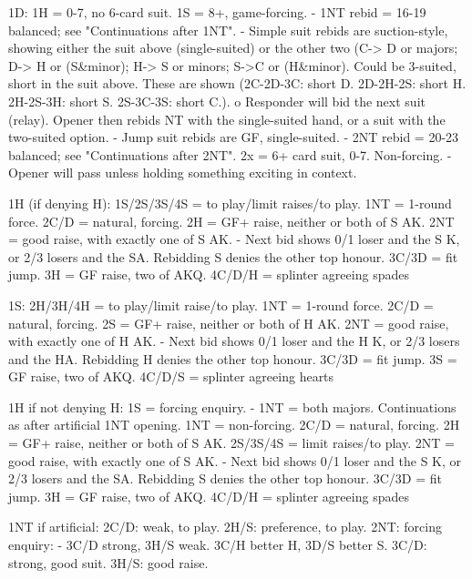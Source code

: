 1D:
   1H = 0-7, no 6-card suit.
   1S = 8+, game-forcing.
      - 1NT rebid = 16-19 balanced; see "Continuations after 1NT".
      - Simple suit rebids are suction-style, showing either the suit above
         (single-suited) or the other two (C-> D or majors; D-> H or (S&minor); H->
         S or minors; S->C or (H&minor). Could be 3-suited, short in the suit
         above. These are shown (2C-2D-3C: short D. 2D-2H-2S: short H. 2H-2S-3H:
         short S. 2S-3C-3S: short C.).
            o Responder will bid the next suit (relay). Opener then rebids NT with the
               single-suited hand, or a suit with the two-suited option.
      - Jump suit rebids are GF, single-suited.
      - 2NT rebid = 20-23 balanced; see "Continuations after 2NT".
   2x = 6+ card suit, 0-7. Non-forcing.
      - Opener will pass unless holding something exciting in context.

1H (if denying H):
   1S/2S/3S/4S = to play/limit raises/to play.
   1NT = 1-round force.
   2C/D = natural, forcing.
   2H = GF+ raise, neither or both of S AK.
   2NT = good raise, with exactly one of S AK.
      - Next bid shows 0/1 loser and the S K, or 2/3 losers and the SA.
         Rebidding S denies the other top honour.
   3C/3D = fit jump.
   3H = GF raise, two of AKQ.
   4C/D/H = splinter agreeing spades

1S:
   2H/3H/4H = to play/limit raise/to play.
   1NT = 1-round force.
   2C/D = natural, forcing.
   2S = GF+ raise, neither or both of H AK.
   2NT = good raise, with exactly one of H AK.
      - Next bid shows 0/1 loser and the H K, or 2/3 losers and the HA.
         Rebidding H denies the other top honour.
   3C/3D = fit jump.
   3S = GF raise, two of AKQ.
   4C/D/S = splinter agreeing hearts

1H if not denying H:
   1S = forcing enquiry.
      - 1NT = both majors. Continuations as after artificial 1NT opening.
   1NT = non-forcing.
   2C/D = natural, forcing.
   2H = GF+ raise, neither or both of S AK.
   2S/3S/4S = limit raises/to play.
   2NT = good raise, with exactly one of S AK.
      - Next bid shows 0/1 loser and the S K, or 2/3 losers and the SA.
         Rebidding S denies the other top honour.
   3C/3D = fit jump.
   3H = GF raise, two of AKQ.
   4C/D/H = splinter agreeing spades

1NT if artificial:
   2C/D: weak, to play.
   2H/S: preference, to play.
   2NT: forcing enquiry:
      - 3C/D strong, 3H/S weak. 3C/H better H, 3D/S better S.
   3C/D: strong, good suit.
   3H/S: good raise.

